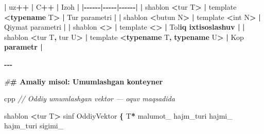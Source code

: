 \documentclass[a4paper,11pt,twoside,openright]{book}
\newenvironment{Shaded}{\begin{snugshade}}{\end{snugshade}}
\newcommand{\CharTok}[1]{\textcolor[rgb]{0.31,0.60,0.02}{#1}}
\newcommand{\CommentTok}[1]{\textcolor[rgb]{0.56,0.35,0.01}{\textit{#1}}}
\newcommand{\DataTypeTok}[1]{\textcolor[rgb]{0.13,0.29,0.53}{#1}}
\newcommand{\ErrorTok}[1]{\textcolor[rgb]{0.64,0.00,0.00}{\textbf{#1}}}
\newcommand{\KeywordTok}[1]{\textcolor[rgb]{0.13,0.29,0.53}{\textbf{#1}}}
\newcommand{\NormalTok}[1]{#1}
\newcommand{\OperatorTok}[1]{\textcolor[rgb]{0.81,0.36,0.00}{\textbf{#1}}}
\newcommand{\PreprocessorTok}[1]{\textcolor[rgb]{0.56,0.35,0.01}{\textit{#1}}}
\newcommand{\VariableTok}[1]{\textcolor[rgb]{0.00,0.00,0.00}{#1}}
\begin{document}
\begin{Shaded}
\begin{Highlighting}[]
\OperatorTok{|}\NormalTok{ uz}\OperatorTok{++} \OperatorTok{|}\NormalTok{ C}\OperatorTok{++} \OperatorTok{|}\NormalTok{ Izoh }\OperatorTok{|}
\OperatorTok{|{-}{-}{-}{-}{-}{-}|{-}{-}{-}{-}{-}|{-}{-}{-}{-}{-}{-}|}
\OperatorTok{|} \ErrorTok{\textasciigrave{}}\NormalTok{shablon }\OperatorTok{\textless{}}\NormalTok{tur T}\OperatorTok{\textgreater{}}\ErrorTok{\textasciigrave{}} \OperatorTok{|} \ErrorTok{\textasciigrave{}}\NormalTok{template }\OperatorTok{\textless{}}\KeywordTok{typename}\NormalTok{ T}\OperatorTok{\textgreater{}}\ErrorTok{\textasciigrave{}} \OperatorTok{|}\NormalTok{ Tur parametri }\OperatorTok{|}
\OperatorTok{|} \ErrorTok{\textasciigrave{}}\NormalTok{shablon }\OperatorTok{\textless{}}\NormalTok{butun N}\OperatorTok{\textgreater{}}\ErrorTok{\textasciigrave{}} \OperatorTok{|} \ErrorTok{\textasciigrave{}}\NormalTok{template }\OperatorTok{\textless{}}\DataTypeTok{int}\NormalTok{ N}\OperatorTok{\textgreater{}}\ErrorTok{\textasciigrave{}} \OperatorTok{|}\NormalTok{ Qiymat parametri }\OperatorTok{|}
\OperatorTok{|} \ErrorTok{\textasciigrave{}}\NormalTok{shablon }\OperatorTok{\textless{}\textgreater{}}\ErrorTok{\textasciigrave{}} \OperatorTok{|} \ErrorTok{\textasciigrave{}}\NormalTok{template }\OperatorTok{\textless{}\textgreater{}}\ErrorTok{\textasciigrave{}} \OperatorTok{|}\NormalTok{ To}\CharTok{\textquotesingle{}l}\ErrorTok{iq ixtisoslashuv |}
\OperatorTok{|} \ErrorTok{\textasciigrave{}}\NormalTok{shablon }\OperatorTok{\textless{}}\NormalTok{tur T}\OperatorTok{,}\NormalTok{ tur U}\OperatorTok{\textgreater{}}\ErrorTok{\textasciigrave{}} \OperatorTok{|} \ErrorTok{\textasciigrave{}}\NormalTok{template }\OperatorTok{\textless{}}\KeywordTok{typename}\NormalTok{ T}\OperatorTok{,} \KeywordTok{typename}\NormalTok{ U}\OperatorTok{\textgreater{}}\ErrorTok{\textasciigrave{}} \OperatorTok{|}\NormalTok{ Ko}\CharTok{\textquotesingle{}p}\ErrorTok{ parametr |}

\OperatorTok{{-}{-}{-}}

\PreprocessorTok{\#}\ErrorTok{\# Amaliy misol: Umumlashgan konteyner}

\ErrorTok{\textasciigrave{}\textasciigrave{}\textasciigrave{}}\NormalTok{cpp}
\CommentTok{// Oddiy umumlashgan vektor — o\textquotesingle{}quv maqsadida}

\NormalTok{shablon }\OperatorTok{\textless{}}\NormalTok{tur T}\OperatorTok{\textgreater{}}
\NormalTok{sinf OddiyVektor }\OperatorTok{\{}
\NormalTok{    T}\OperatorTok{*} \VariableTok{malumot\_}
\NormalTok{    hajm\_turi }\VariableTok{hajmi\_}
\NormalTok{    hajm\_turi }\VariableTok{sigimi\_}


\end{Highlighting}
\end{Shaded}
\end{document}
